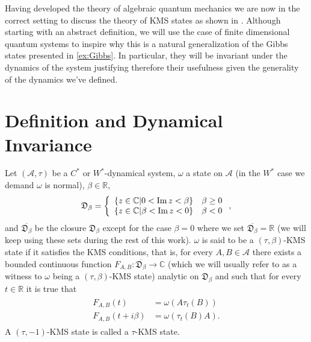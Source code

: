Having developed the theory of algebraic quantum mechanics we are now in the correct setting to discuss the theory of KMS states as shown in \cite{Duvenhage1999}. Although starting with an abstract definition, we will use the case of finite dimensional quantum systems to inspire why this is a natural generalization of the Gibbs states presented in \ref{ex:Gibbs}. In particular, they will be invariant under the dynamics of the system justifying therefore their usefulness given the generality of the dynamics we've defined.

\section{Definition and Dynamical Invariance}

\begin{definition}\label{def:KMS}
Let $(\mathcal{A},\tau)$ be a $C^*$ or $W^*$-dynamical system, $\omega$ a state on $\mathcal{A}$ (in the $W^*$ case we demand $\omega$ is normal), $\beta\in\mathbb{R}$,
\begin{align}
\begin{split}
\mathfrak{D}_\beta=\left\{
\begin{array}{lr}
\{z\in\mathbb{C}|0<\operatorname{Im} z<\beta\} &\beta \geq 0 \\
\{z\in\mathbb{C}|\beta<\operatorname{Im} z<0\} &\beta < 0
\end{array}\right.,
\end{split}
\end{align}  
and $\overline{\mathfrak{D}_\beta}$ be the closure $\mathfrak{D}_\beta$ except for the case $\beta=0$ where we set $\overline{\mathfrak{D}_\beta}=\mathbb{R}$ (we will keep using these sets during the rest of this work). $\omega$ is said to be a $(\tau,\beta)$-KMS state if it satisfies the KMS conditions, that is, for every $A,B\in\mathcal{A}$ there exists a bounded continuous function $F_{A,B}:\overline{\mathfrak{D}_\beta}\rightarrow \mathbb{C}$ (which we will usually refer to as a witness to $\omega$ being a $(\tau,\beta)$-KMS state) analytic on $\mathfrak{D}_\beta$ and such that for every $t\in\mathbb{R}$ it is true that
\begin{align}
\begin{split}
F_{A,B}(t)&=\omega(A\tau_t(B)) \\
F_{A,B}(t+i\beta)&=\omega(\tau_t(B)A).
\end{split}
\end{align}
A $(\tau,-1)$-KMS state is called a $\tau$-KMS state.
\end{definition}

